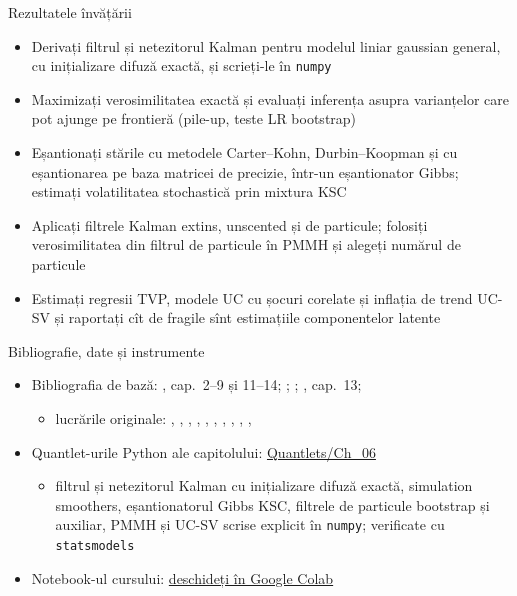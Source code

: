 \begin{frame}{Rezultatele învățării}
\itemsize{\small}
\begin{itemize}
    \item Derivați filtrul și netezitorul Kalman pentru modelul liniar gaussian general, cu inițializare difuză exactă, și scrieți-le în \texttt{numpy}
    \item Maximizați verosimilitatea exactă și evaluați inferența asupra varianțelor care pot ajunge pe frontieră (pile-up, teste LR bootstrap)
    \item Eșantionați stările cu metodele Carter--Kohn, Durbin--Koopman și cu eșantionarea pe baza matricei de precizie, într-un eșantionator Gibbs; estimați volatilitatea stochastică prin mixtura KSC
    \item Aplicați filtrele Kalman extins, unscented și de particule; folosiți verosimilitatea din filtrul de particule în PMMH și alegeți numărul de particule
    \item Estimați regresii TVP, modele UC cu șocuri corelate și inflația de trend UC-SV și raportați cît de fragile sînt estimațiile componentelor latente
\end{itemize}
\end{frame}

\begin{frame}{Bibliografie, date și instrumente}
\itemsize{\small}
\begin{itemize}
    \item Bibliografia de bază: , cap.~2--9 și 11--14; ; ; , cap.~13; 
    \begin{itemize}
        \item lucrările originale: , , , , , , , , , , 
    \end{itemize}
    \item Quantlet-urile Python ale capitolului: \href{https://github.com/danpele/Advanced-Time-Series/tree/main/Quantlets/Ch_06}{Quantlets/Ch\_06}
    \begin{itemize}
        \item filtrul și netezitorul Kalman cu inițializare difuză exactă, simulation smoothers, eșantionatorul Gibbs KSC, filtrele de particule bootstrap și auxiliar, PMMH și UC-SV scrise explicit în \texttt{numpy}; verificate cu \texttt{statsmodels}
    \end{itemize}
    \item Notebook-ul cursului: \href{\colaburl{notebooks/EN/chapter6_lecture_notebook.ipynb}}{deschideți în Google Colab}
\end{itemize}
\end{frame}

